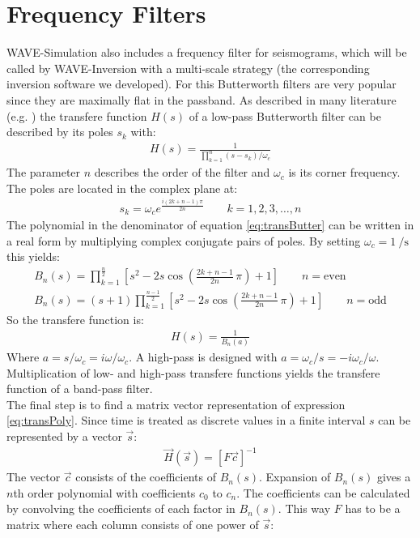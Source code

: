 \documentclass[pdftex,a4paper,parskip,listof=totoc,bibliography=totoc,onehalfspacing,12pt]{scrreprt}
\begin{document}
\chapter{Frequency Filters}
WAVE-Simulation also includes a frequency filter for seismograms, which will be called by WAVE-Inversion with a multi-scale strategy (the corresponding inversion software we developed). For this Butterworth filters are very popular since they are maximally flat in the passband. As described in many literature (e.g. \cite{bianchi2007electronic}) the transfere function $H(s)$ of a low-pass Butterworth filter can be described by its poles $s_k$ with:
\begin{align}
 H(s)=\frac{1}{\prod_{k=1}^n (s-s_k)/\omega_c} \label{eq:transButter}
\end{align}
The parameter $n$ describes the order of the filter and $\omega_c$ is its corner frequency. 
The poles are located in the complex plane at:
\begin{align}
 s_k = \omega_c e^{\frac{i(2k+n-1)\pi}{2n}}\qquad k = 1,2,3,\ldots, n
\end{align}
The polynomial in the denominator of equation \ref{eq:transButter} can be written in a real form by multiplying complex conjugate pairs of poles. By setting $\omega_c = \SI{1}{\per\second}$ this yields:
\begin{align}
  B_n(s)=\prod_{k=1}^{\frac{n}{2}} \left[s^2-2s\cos\left(\frac{2k+n-1}{2n}\,\pi\right)+1\right]\qquad n = \text{even} \\
  B_n(s)=(s+1)\prod_{k=1}^{\frac{n-1}{2}} \left[s^2-2s\cos\left(\frac{2k+n-1}{2n}\,\pi\right)+1\right]\qquad n = \text{odd}
\end{align}
So the transfere function is:
\begin{align}
H(s) = \frac{1}{B_n(a)} \label{eq:transPoly}
\end{align}
Where $a= s/\omega_c = i \omega / \omega_c$. A high-pass is designed with $a= \omega_c/s = -i \omega_c / \omega$. Multiplication of low- and high-pass transfere functions yields the transfere function of a band-pass filter.\\ The final step is to find a matrix vector representation of expression \ref{eq:transPoly}. Since time is treated as discrete values in a finite interval $s$ can be represented by a vector $\vec{s}$:
\begin{align}
 \vec{H}(\vec{s}) = \left[ F \vec{c} \right]^{-1}
\end{align}
The vector $\vec{c}$ consists of the coefficients of $B_n(s)$. Expansion of $B_n(s)$ gives a $n$th order polynomial with coefficients $c_0$ to $c_n$. The coefficients can be calculated by convolving the coefficients of each factor in $B_n(s)$. This way $F$ has to be a matrix where each column consists of one power of $\vec{s}$:
\end{document}
